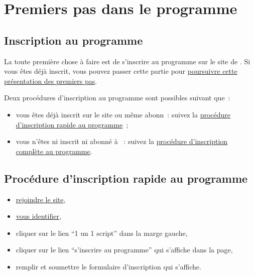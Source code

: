 % 
% 
% 
% 
% 
% 
% 
% 

\section{Premiers pas dans le programme}\hypertarget{premiers-pas}{}\label{premiers-pas}

\subsection{Inscription au programme}\hypertarget{inscription-programme}{}\label{inscription-programme}

La toute première chose à faire est de s'inscrire au programme \unan{} sur le site de \boa{}. Si vous êtes déjà inscrit, vous pouvez passer cette partie pour \hyperlink{premiers-pas-apres-inscription}{poursuivre cette présentation des premiers pas}.

Deux procédures d'inscription au programme sont possibles suivant que~{}:

\begin{itemize}
\item vous êtes déjà inscrit sur le site ou même abonn~{}: suivez la \hyperlink{procedure-inscription-rapide}{procédure d'inscription rapide au programme}~{};
\item vous n'êtes ni inscrit ni abonné à \boa{}~{}: suivez la \hyperlink{procedure-inscription-complete}{procédure d'inscription complète au programme}.
\end{itemize}

\subsection{Procédure d'inscription rapide au programme}\hypertarget{procedure-inscription-rapide}{}\label{procedure-inscription-rapide}

\begin{itemize}
\item \hyperlink{rejoindre-site}{rejoindre le site},
\item \hyperlink{vous-identifier}{vous identifier},
\item cliquer sur le lien ``1 un 1 script'' dans la marge gauche,
\item cliquer sur le lien ``s'inscrire au programme'' qui s'affiche dans la page,
\item remplir et soumettre le formulaire d'inscription qui s'affiche.
\end{itemize}

